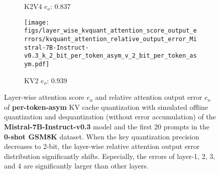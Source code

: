 \begin{figure}
\begin{subfigure}{0.25\columnwidth}
    \caption{K2V4 $e_o$: 0.837 }
    \label{fig:kvcache_simulated_quant_error_layer_wise_k2v4_per_token_asym_Mistral-7B-Instruct-v0.3}
    \end{subfigure}
    \begin{subfigure}{0.25\columnwidth}
    \texttt{[image: figs/layer\_wise\_kvquant\_attention\_score\_output\_errors/kvquant\_attention\_relative\_output\_error\_Mistral-7B-Instruct-v0.3\_k\_2\_bit\_per\_token\_asym\_v\_2\_bit\_per\_token\_asym.pdf]}
    \caption{KV2 $e_o$: 0.939}
    \label{fig:kvcache_simulated_quant_error_layer_wise_k2v2_per_token_asym_Mistral-7B-Instruct-v0.3}
    \end{subfigure}
    \caption{Layer-wise attention score $e_a$ and relative attention output error $e_o$ of \textbf{per-token-asym} KV cache quantization with simulated offline quantization and dequantization (without error accumulation) of the \textbf{Mistral-7B-Instruct-v0.3} model and the first 20 prompts in the \textbf{0-shot GSM8K} dataset. When the key quantization precision decreases to 2-bit, the layer-wise relative attention output error distribution significantly shifts. Especially, the errors of layer-1, 2, 3, and 4 are significantly larger than other layers.}
\label{fig:kvcache_simulated_quant_attention_score_relative_output_error_layer_wise_per_token_asym_Mistral-7B-Instruct-v0.3}
\end{figure}